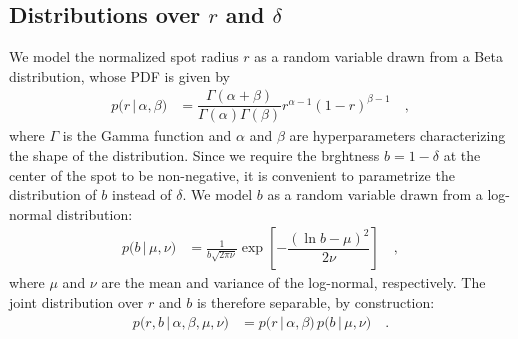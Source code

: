 \documentclass[modern]{aastex62}
\begin{document}
\subsection{Distributions over $r$ and $\delta$}
%
We model the normalized spot radius $r$ as a random variable drawn from
a Beta distribution, whose PDF is given by
%
\begin{align}
    p \big(r \, \big| \, \alpha, \beta \big)
     & =
    \dfrac{\Gamma(\alpha + \beta)}{\Gamma(\alpha)\Gamma(\beta)}
    r^{\alpha - 1}
    (1 - r)^{\beta - 1}
    \quad,
\end{align}
%
where $\Gamma$ is the Gamma function and $\alpha$ and $\beta$ are
hyperparameters characterizing the shape of the distribution.
%
Since we require the brghtness $b = 1 - \delta$ at the center of the spot to
be non-negative, it is convenient to parametrize the distribution of $b$
instead of $\delta$. We model $b$ as a random variable drawn from a log-normal
distribution:
%
\begin{align}
    p \big(b \, \big| \, \mu, \nu \big)
     & =
    \frac{1}{b\sqrt{2\pi\nu}}
    \exp\left[
        -\dfrac{\left(\ln b - \mu\right)^2}{2\nu}
        \right]
    \quad,
\end{align}
%
where $\mu$ and $\nu$ are the mean and variance of the log-normal, respectively.
The joint distribution over $r$ and $b$ is therefore separable,
by construction:
%
\begin{align}
    p \big( r, b \, \big| \, \alpha, \beta, \mu, \nu \big)
     & =
    p \big(r \, \big| \, \alpha, \beta \big)
    \,
    p \big(b \, \big| \, \mu, \nu \big)
    \quad.
\end{align}
%
\end{document}
